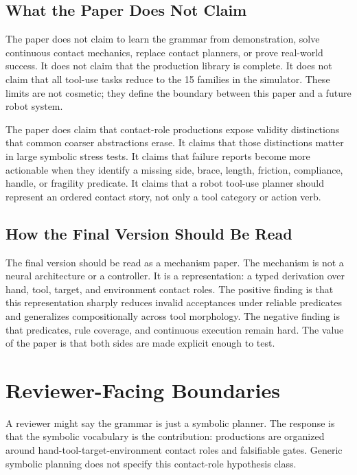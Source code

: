 \documentclass{article}
\begin{document}
\subsection{What the Paper Does Not Claim}

The paper does not claim to learn the grammar from demonstration, solve continuous contact mechanics, replace contact planners, or prove real-world success. It does not claim that the production library is complete. It does not claim that all tool-use tasks reduce to the 15 families in the simulator. These limits are not cosmetic; they define the boundary between this paper and a future robot system.

The paper does claim that contact-role productions expose validity distinctions that common coarser abstractions erase. It claims that those distinctions matter in large symbolic stress tests. It claims that failure reports become more actionable when they identify a missing side, brace, length, friction, compliance, handle, or fragility predicate. It claims that a robot tool-use planner should represent an ordered contact story, not only a tool category or action verb.

\subsection{How the Final Version Should Be Read}

The final version should be read as a mechanism paper. The mechanism is not a neural architecture or a controller. It is a representation: a typed derivation over hand, tool, target, and environment contact roles. The positive finding is that this representation sharply reduces invalid acceptances under reliable predicates and generalizes compositionally across tool morphology. The negative finding is that predicates, rule coverage, and continuous execution remain hard. The value of the paper is that both sides are made explicit enough to test.

\section{Reviewer-Facing Boundaries}

A reviewer might say the grammar is just a symbolic planner. The response is that the symbolic vocabulary is the contribution: productions are organized around hand-tool-target-environment contact roles and falsifiable gates. Generic symbolic planning does not specify this contact-role hypothesis class.
\end{document}

